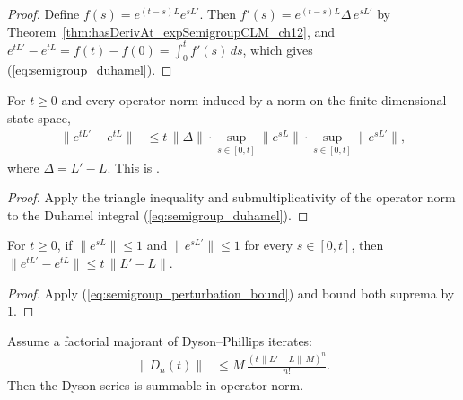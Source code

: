\begin{proof}
    \leanok
    Define $f(s) = e^{(t-s)L}e^{sL'}$.
    Then $f'(s) = e^{(t-s)L}\Delta\,e^{sL'}$ by
    Theorem~\ref{thm:hasDerivAt_expSemigroupCLM_ch12}, and
    $e^{tL'} - e^{tL} = f(t) - f(0) = \int_0^t f'(s)\,ds$,
    which gives (\ref{eq:semigroup_duhamel}).
\end{proof}

\begin{theorem}\label{thm:perturbation_bound_ch12}
    \leanok
    For $t \ge 0$ and every operator norm induced by a norm on the
    finite-dimensional state space,
    \begin{align}
        \bigl\|e^{tL'} - e^{tL}\bigr\|
        &\le t\,\|\Delta\|
        \cdot \sup_{s \in [0,t]}\|e^{sL}\|
        \cdot \sup_{s \in [0,t]}\|e^{sL'}\|,
        \label{eq:semigroup_perturbation_bound}
    \end{align}
    where $\Delta = L' - L$.
    This is \cite[Corollary~7.1]{Wolf2012Quantum}.
\end{theorem}

\begin{proof}
    \leanok
    Apply the triangle inequality and submultiplicativity of the
    operator norm to the Duhamel integral
    (\ref{eq:semigroup_duhamel}).
\end{proof}

\begin{corollary}
    \label{cor:perturbation_bound_unit_norm_ch12}
    \leanok
    For $t \ge 0$, if $\|e^{sL}\| \le 1$ and $\|e^{sL'}\| \le 1$ for every
    $s \in [0,t]$, then
    $\|e^{tL'} - e^{tL}\| \le t\,\|L' - L\|$.
\end{corollary}

\begin{proof}
    \leanok
    Apply (\ref{eq:semigroup_perturbation_bound}) and bound both suprema
    by $1$.
\end{proof}

\begin{lemma}
    \label{lem:summable_dyson_factorial_ch12}
    \leanok
    Assume a factorial majorant of Dyson--Phillips iterates:
    \begin{align}
        \|D_n(t)\|
        &\le M\,\frac{(t\,\|L'-L\|\,M)^n}{n!}.
        \label{eq:semigroup_dyson_majorant}
    \end{align}
    Then the Dyson series is summable in operator norm.
\end{lemma}

